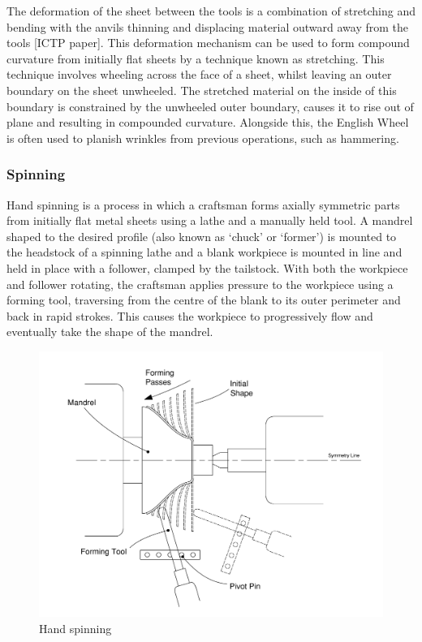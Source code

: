 The deformation of the sheet between the tools is a combination of stretching and bending with the anvils thinning and displacing material outward away from the tools [ICTP paper]. This deformation mechanism can be used to form compound curvature from initially flat sheets by a technique known as stretching. This technique involves wheeling across the face of a sheet, whilst leaving an outer boundary on the sheet unwheeled. The stretched material on the inside of this boundary is constrained by the unwheeled outer boundary, causes it to rise out of plane and resulting in compounded curvature. Alongside this, the English Wheel is often used to planish wrinkles from previous operations, such as hammering.

\subsubsection*{Spinning}
Hand spinning is a process in which a craftsman forms axially symmetric parts from initially flat metal sheets using a lathe and a manually held tool. A mandrel shaped to the desired profile (also known as `chuck' or `former') is mounted to the headstock of a spinning lathe and a blank workpiece is mounted in line and held in place with a follower, clamped by the tailstock. With both the workpiece and follower rotating, the craftsman applies pressure to the workpiece using a forming tool, traversing from the centre of the blank to its outer perimeter and back in rapid strokes. This causes the workpiece to progressively flow and eventually take the shape of the mandrel. 

\begin{figure}[h]
    \centering
    \includegraphics[width=0.6\linewidth]{Images/SpinningTechDrawing.pdf}
    \caption{Hand spinning}
    \label{fig:SpinningTechDrawing}
\end{figure}

